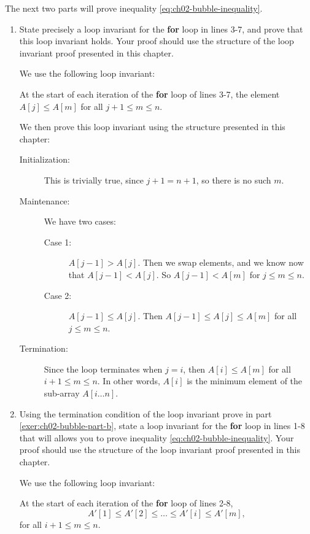 \documentclass[Chapter02]{subfiles}
\begin{document}
\begin{enumerate}[leftmargin=\labelsep,label={\textbf{\thesection-\arabic*}}]
		The next two parts will prove inequality \ref{eq:ch02-bubble-inequality}.

		\begin{enumerate}[resume]
			\item State precisely a loop invariant for the \textbf{for} loop in lines 3-7, and prove that this loop invariant holds. Your proof should use the structure of the loop invariant proof presented in this chapter. \label{exer:ch02-bubble-part-b}
			\begin{answer}
				We use the following loop invariant:
				\begin{addmargin}[2em]{2em}
					At the start of each iteration of the \textbf{for} loop of lines 3-7, the element $A[j] \leq A[m]$ for all $j + 1 \leq m \leq n$.
				\end{addmargin}

				We then prove this loop invariant using the structure presented in this chapter:
				\begin{description}
					\item[Initialization:] This is trivially true, since $j + 1 = n + 1$, so there is no such $m$.

					\item[Maintenance:] We have two cases:
					\begin{description}
						\item[Case 1:] $A[j - 1] > A[j]$. Then we swap elements, and we know now that $A[j - 1] < A[j]$. So $A[j - 1] < A[m]$ for $j \leq m \leq n$.
						\item[Case 2:] $A[j - 1] \leq A[j]$. Then $A[j - 1] \leq A[j] \leq A[m]$ for all $j \leq m \leq n$.
					\end{description}

					\item[Termination:] Since the loop terminates when $j = i$, then $A[i] \leq A[m]$ for all $i + 1 \leq m \leq n$. In other words, $A[i]$ is the minimum element of the sub-array $A[i \dots n]$.
				\end{description}
			\end{answer}
			
			\item Using the termination condition of the loop invariant prove in part \ref{exer:ch02-bubble-part-b}, state a loop invariant for the \textbf{for} loop in lines 1-8 that will allows you to prove inequality \eqref{eq:ch02-bubble-inequality}. Your proof should use the structure of the loop invariant proof presented in this chapter.
			\begin{answer}
				We use the following loop invariant:
				\begin{addmargin}[2em]{2em}
					At the start of each iteration of the \textbf{for} loop of lines 2-8,
					\begin{equation}
						A'[1] \leq A'[2] \leq \dots \leq A'[i] \leq A'[m], \label{eq:ch02-bubble-invariant-inequality}
					\end{equation}
					for all $i + 1 \leq m \leq n$.
				\end{addmargin}


\end{answer}
\end{enumerate}
\end{enumerate}
\end{document}

